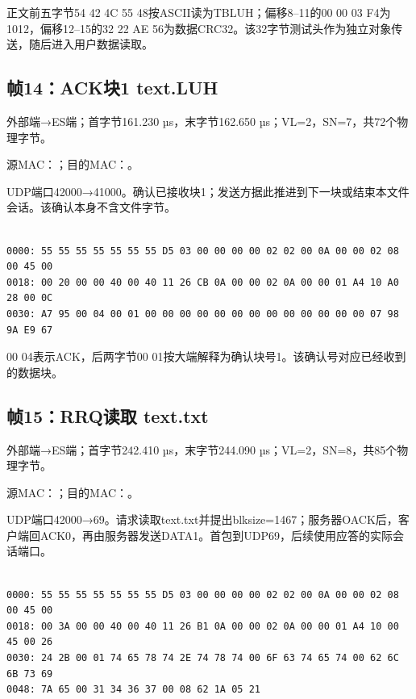 正文前五字节54 42 4C 55 48按ASCII读为TBLUH；偏移8--11的00 00 03 F4为1012，偏移12--15的32 22 AE 56为数据CRC32。该32字节测试头作为独立对象传送，随后进入用户数据读取。

\subsection*{帧14：ACK块1 text.LUH}

外部端→ES端；首字节161.230 µs，末字节162.650 µs；VL=2，SN=7，共72个物理字节。

源MAC：；目的MAC：。

UDP端口42000→41000。确认已接收块1；发送方据此推进到下一块或结束本文件会话。该确认本身不含文件字节。

\par\noindent\begin{minipage}{\linewidth}
\begin{lstlisting}[caption={帧14物理字节，偏移0000--0047}]

0000: 55 55 55 55 55 55 55 D5 03 00 00 00 00 02 02 00 0A 00 00 02 08 00 45 00
0018: 00 20 00 00 40 00 40 11 26 CB 0A 00 00 02 0A 00 00 01 A4 10 A0 28 00 0C
0030: A7 95 00 04 00 01 00 00 00 00 00 00 00 00 00 00 00 00 00 07 98 9A E9 67

\end{lstlisting}
\end{minipage}\par

00 04表示ACK，后两字节00 01按大端解释为确认块号1。该确认号对应已经收到的数据块。

\subsection*{帧15：RRQ读取 text.txt}

外部端→ES端；首字节242.410 µs，末字节244.090 µs；VL=2，SN=8，共85个物理字节。

源MAC：；目的MAC：。

UDP端口42000→69。请求读取text.txt并提出blksize=1467；服务器OACK后，客户端回ACK0，再由服务器发送DATA1。首包到UDP69，后续使用应答的实际会话端口。

\par\noindent\begin{minipage}{\linewidth}
\begin{lstlisting}[caption={帧15物理字节，偏移0000--0054}]

0000: 55 55 55 55 55 55 55 D5 03 00 00 00 00 02 02 00 0A 00 00 02 08 00 45 00
0018: 00 3A 00 00 40 00 40 11 26 B1 0A 00 00 02 0A 00 00 01 A4 10 00 45 00 26
0030: 24 2B 00 01 74 65 78 74 2E 74 78 74 00 6F 63 74 65 74 00 62 6C 6B 73 69
0048: 7A 65 00 31 34 36 37 00 08 62 1A 05 21

\end{lstlisting}
\end{minipage}\par

